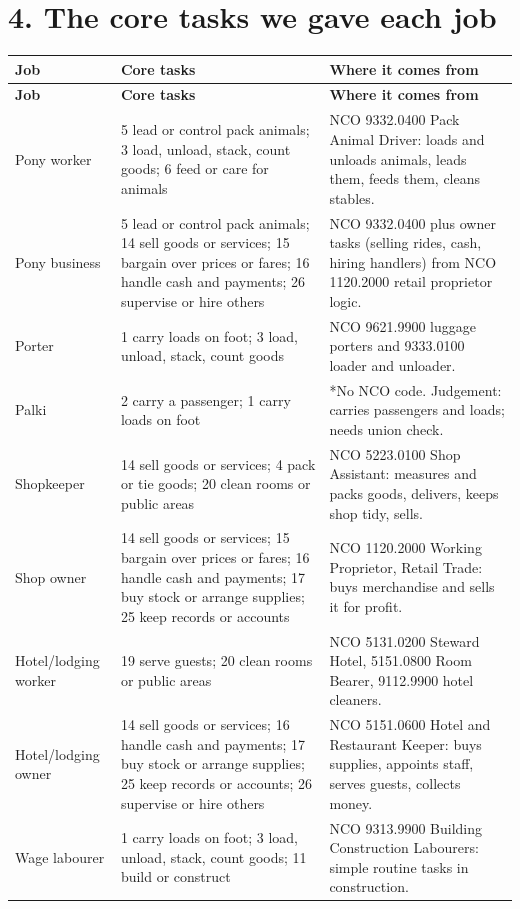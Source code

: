 \documentclass[11pt]{article}
\begin{document}
\section*{4. The core tasks we gave each job}
{\footnotesize
\begin{longtable}{p{2.7cm}p{5.6cm}p{6.5cm}}
\toprule
\textbf{Job} & \textbf{Core tasks} & \textbf{Where it comes from} \\
\midrule
\endfirsthead
\toprule
\textbf{Job} & \textbf{Core tasks} & \textbf{Where it comes from} \\
\midrule
\endhead
Pony worker & 5 lead or control pack animals; 3 load, unload, stack, count goods; 6 feed or care for animals & NCO 9332.0400 Pack Animal Driver: loads and unloads animals, leads them, feeds them, cleans stables. \\
Pony business & 5 lead or control pack animals; 14 sell goods or services; 15 bargain over prices or fares; 16 handle cash and payments; 26 supervise or hire others & NCO 9332.0400 plus owner tasks (selling rides, cash, hiring handlers) from NCO 1120.2000 retail proprietor logic. \\
Porter & 1 carry loads on foot; 3 load, unload, stack, count goods & NCO 9621.9900 luggage porters and 9333.0100 loader and unloader. \\
Palki & 2 carry a passenger; 1 carry loads on foot & *No NCO code. Judgement: carries passengers and loads; needs union check. \\
Shopkeeper & 14 sell goods or services; 4 pack or tie goods; 20 clean rooms or public areas & NCO 5223.0100 Shop Assistant: measures and packs goods, delivers, keeps shop tidy, sells. \\
Shop owner & 14 sell goods or services; 15 bargain over prices or fares; 16 handle cash and payments; 17 buy stock or arrange supplies; 25 keep records or accounts & NCO 1120.2000 Working Proprietor, Retail Trade: buys merchandise and sells it for profit. \\
Hotel/lodging worker & 19 serve guests; 20 clean rooms or public areas & NCO 5131.0200 Steward Hotel, 5151.0800 Room Bearer, 9112.9900 hotel cleaners. \\
Hotel/lodging owner & 14 sell goods or services; 16 handle cash and payments; 17 buy stock or arrange supplies; 25 keep records or accounts; 26 supervise or hire others & NCO 5151.0600 Hotel and Restaurant Keeper: buys supplies, appoints staff, serves guests, collects money. \\
Wage labourer & 1 carry loads on foot; 3 load, unload, stack, count goods; 11 build or construct & NCO 9313.9900 Building Construction Labourers: simple routine tasks in construction. \\

\end{longtable}}
\end{document}
